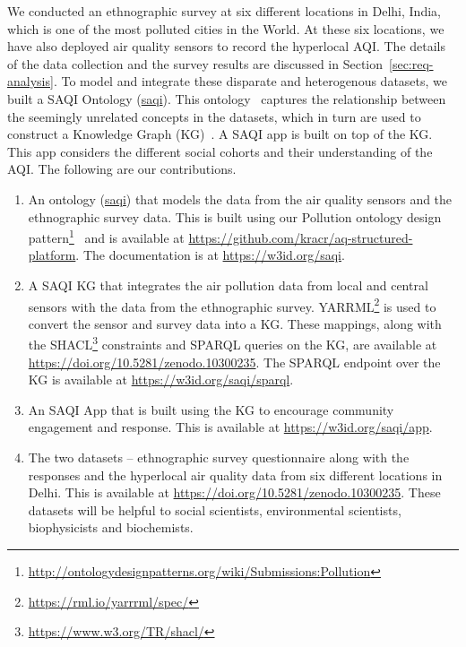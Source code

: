 We conducted an ethnographic survey at six different locations in Delhi, India, which is one of the most polluted cities in the World. At these six locations, we have also deployed air quality sensors to record the hyperlocal AQI. The details of the data collection and the survey results are discussed in Section~\ref{sec:req-analysis}. To model and integrate these disparate and heterogenous datasets, we built a SAQI Ontology (\href{w3id.org/saqi}{saqi}). This ontology~\cite{Ont-NG-2009} captures the relationship between the seemingly unrelated concepts in the datasets, which in turn are used to construct a Knowledge Graph (KG)~\cite{KG-ACMSurvey2021}. A SAQI app is built on top of the KG. This app considers the different social cohorts and their understanding of the AQI. The following are our contributions.
\begin{enumerate}
    \item An ontology (\href{w3id.org/saqi}{saqi}) that models the data from the air quality sensors and the ethnographic survey data. This is built using our Pollution ontology design pattern\footnote{\url{http://ontologydesignpatterns.org/wiki/Submissions:Pollution}}~\cite{Saad-PollutionODP-WOP2021} and is available at \url{https://github.com/kracr/aq-structured-platform}. The documentation is at \url{https://w3id.org/saqi}.
    \item A SAQI KG that integrates the air pollution data from local and central sensors with the data from the ethnographic survey. YARRML\footnote{\url{https://rml.io/yarrrml/spec/}} is used to convert the sensor and survey data into a KG. These mappings, along with the SHACL\footnote{\url{https://www.w3.org/TR/shacl/}} constraints and SPARQL queries on the KG, are available at \url{https://doi.org/10.5281/zenodo.10300235}. The SPARQL endpoint over the KG is available at \url{https://w3id.org/saqi/sparql}.
    \item An SAQI App that is built using the KG to encourage community engagement and response. This is available at \url{https://w3id.org/saqi/app}.
    \item The two datasets -- ethnographic survey questionnaire along with the responses and the hyperlocal air quality data from six different locations in Delhi. This is available at \url{https://doi.org/10.5281/zenodo.10300235}. These datasets will be helpful to social scientists, environmental scientists, biophysicists and biochemists.  
\end{enumerate}


